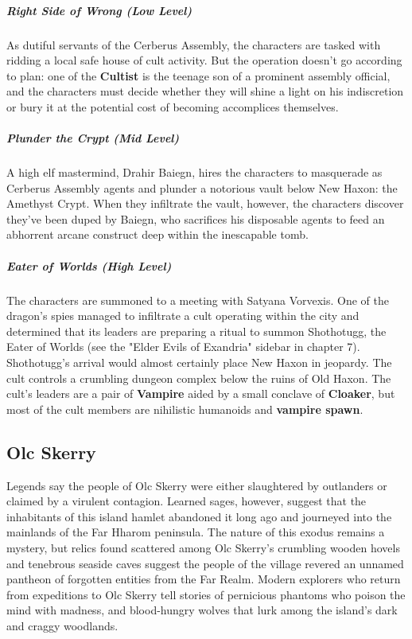 \documentclass[10pt,a4paper,twoside,bg=print,twocolumn,openany,nodeprecatedcode]{dndbook}
\begin{document}
\subparagraph{Right Side of Wrong (Low Level)}
As dutiful servants of the Cerberus Assembly, the characters are tasked with ridding a local safe house of cult activity. But the operation doesn't go according to plan: one of the \textbf{Cultist} is the teenage son of a prominent assembly official, and the characters must decide whether they will shine a light on his indiscretion or bury it at the potential cost of becoming accomplices themselves.

\subparagraph{Plunder the Crypt (Mid Level)}
A high elf mastermind, Drahir Baiegn, hires the characters to masquerade as Cerberus Assembly agents and plunder a notorious vault below New Haxon: the Amethyst Crypt. When they infiltrate the vault, however, the characters discover they've been duped by Baiegn, who sacrifices his disposable agents to feed an abhorrent arcane construct deep within the inescapable tomb.

\subparagraph{Eater of Worlds (High Level)}
The characters are summoned to a meeting with Satyana Vorvexis. One of the dragon's spies managed to infiltrate a cult operating within the city and determined that its leaders are preparing a ritual to summon Shothotugg, the Eater of Worlds (see the "Elder Evils of Exandria" sidebar in chapter 7). Shothotugg's arrival would almost certainly place New Haxon in jeopardy. The cult controls a crumbling dungeon complex below the ruins of Old Haxon. The cult's leaders are a pair of \textbf{Vampire} aided by a small conclave of \textbf{Cloaker}, but most of the cult members are nihilistic humanoids and \textbf{vampire spawn}.

\subsection{Olc Skerry}
Legends say the people of Olc Skerry were either slaughtered by outlanders or claimed by a virulent contagion. Learned sages, however, suggest that the inhabitants of this island hamlet abandoned it long ago and journeyed into the mainlands of the Far Hharom peninsula. The nature of this exodus remains a mystery, but relics found scattered among Olc Skerry's crumbling wooden hovels and tenebrous seaside caves suggest the people of the village revered an unnamed pantheon of forgotten entities from the Far Realm. Modern explorers who return from expeditions to Olc Skerry tell stories of pernicious phantoms who poison the mind with madness, and blood-hungry wolves that lurk among the island's dark and craggy woodlands.
\end{document}
